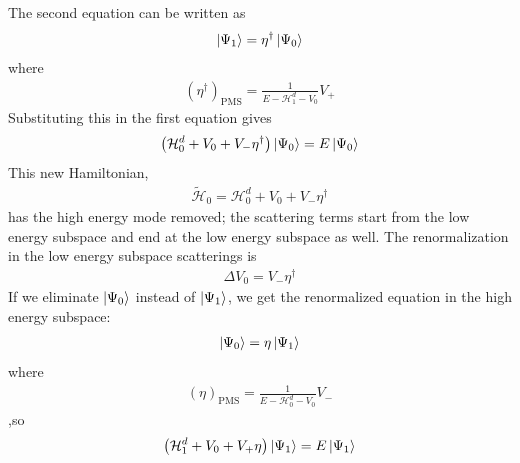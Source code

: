 \documentclass[twoside,11pt]{report}
\numberwithin{equation}{section}
\begin{document}
The second equation can be written as
\begin{equation}\begin{aligned}
\ket{\Psi_1} = \eta^\dagger \ket{\Psi_0}
\end{aligned}\end{equation}
where
\begin{equation}\begin{aligned}
	\left(\eta^\dagger\right)_\text{PMS} = \frac{1}{E - \mathcal{H}^d_1 - V_0}V_+
\end{aligned}\end{equation}
Substituting this in the first equation gives
\begin{equation}\begin{aligned}
	\label{reneq}
	\left(\mathcal{H}^d_0 + V_0 + V_- \eta^\dagger\right)\ket{\Psi_0} = E\ket{\Psi_0}
\end{aligned}\end{equation}
This new Hamiltonian,
\begin{equation}\begin{aligned}
	\tilde{\mathcal{H}}_0 = \mathcal{H}^d_0 + V_0 + V_- \eta^\dagger
\end{aligned}\end{equation}
has the high energy mode removed; the scattering terms start from the low energy subspace and end at the low energy subspace as well. The renormalization in the low energy subspace scatterings  is
\begin{equation}\begin{aligned}
	\label{deltaV}
\Delta V_0 = V_- \eta^\dagger
\end{aligned}\end{equation}
If we eliminate \(\ket{\Psi_0}\) instead of \(\ket{\Psi_1}\), we get the renormalized equation in the high energy subspace:
\begin{equation}\begin{aligned}
\ket{\Psi_0} = \eta \ket{\Psi_1}
\end{aligned}\end{equation}
where
\begin{equation}\begin{aligned}
	\left(\eta\right)_\text{PMS} = \frac{1}{E - \mathcal{H}^d_0 - V_0}V_-
\end{aligned}\end{equation}
,so
\begin{equation}\begin{aligned}
	\left(\mathcal{H}^d_1 + V_0 + V_+ \eta\right)\ket{\Psi_1} = E\ket{\Psi_1}
\end{aligned}\end{equation}
\end{document}
